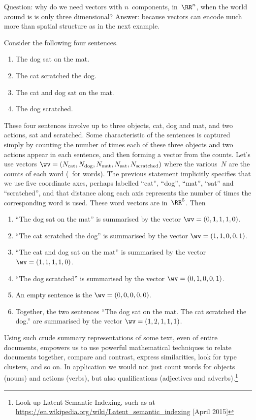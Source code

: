 Question: why do we need vectors with \(n\)~components, in~\(\RR^n\), when the world around is is only three dimensional?
Answer: because vectors can encode much more than spatial structure as in the next example. 


\begin{example} \label{eg:deflsv}
Consider the following four sentences.
\begin{enumerate}
\item The dog sat on the mat.
\item The cat scratched the dog.
\item The cat and dog sat on the mat.
\item The dog scratched.
\end{enumerate}
These four sentences involve up to three objects, cat, dog and mat, and two actions, sat and scratched.  
Some characteristic of the sentences is captured simply by counting the number of times each of these three objects and two actions appear in each sentence, and then forming a vector from the counts.
Let's use vectors \(\wv=(N_{\text{cat}}, N_{\text{dog}}, N_{\text{mat}}, N_{\text{sat}}, N_{\text{scratched}})\) where the various~\(N\) are the counts of each word (\wv~for words). 
The previous statement implicitly specifies that we use five coordinate axes, perhaps labelled ``cat'', ``dog'', ``mat'', ``sat'' and ``scratched'', and that distance along each axis represents the number of times the corresponding word is used.
These word vectors are in~\(\RR^5\).
Then
\begin{enumerate}
\item ``The dog sat on the mat'' is summarised by the vector \(\wv=(0,1,1,1,0)\).
\item ``The cat scratched the dog'' is summarised by the vector \(\wv=(1,1,0,0,1)\).
\item ``The cat and dog sat on the mat'' is summarised by the vector \(\wv=(1,1,1,1,0)\).
\item ``The dog scratched'' is summarised by the vector \(\wv=(0,1,0,0,1)\).
\item An empty sentence is the  \(\wv=(0,0,0,0,0)\).
\item Together, the two sentences ``The dog sat on the mat.
 The cat scratched the dog.'' are summarised by the vector \(\wv=(1,2,1,1,1)\).
\end{enumerate}
Using such crude summary representations of some text, even of entire documents, empowers us to use powerful mathematical techniques to relate documents together, compare and contrast, express similarities, look for type clusters, and so on.
In application we would not just count words for objects (nouns) and actions (verbs), but also qualifications (adjectives and adverbs).\footnote{Look up Latent Semantic Indexing, such as at \url{https://en.wikipedia.org/wiki/Latent_semantic_indexing} [April 2015]}


\end{example}
